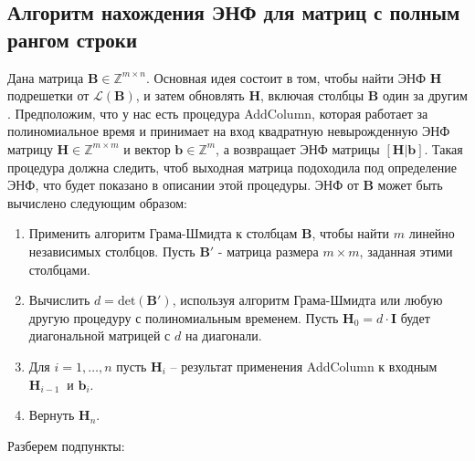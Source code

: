 \subsection{Алгоритм нахождения ЭНФ для матриц с полным рангом строки}

Дана матрица $ \mathbf{B} \in \mathbb{Z}^{m \times n} $. Основная идея состоит в том, чтобы найти ЭНФ $ \mathbf{H} $ подрешетки от $ \mathcal{L}(\mathbf{B}) $, и затем обновлять $ \mathbf{H} $, включая столбцы $ \mathbf{B} $ один за другим \cite{lec4}. Предположим, что у нас есть процедура AddColumn, которая работает за полиномиальное время и принимает на вход квадратную невырожденную ЭНФ матрицу $ \mathbf{H} \in \mathbb{Z}^{m \times m} $ и вектор $ \mathbf{b} \in \mathbb{Z}^{m}$, а возвращает ЭНФ матрицы $ [\mathbf{H|b}] $. Такая процедура должна следить, чтоб выходная матрица подоходила под определение ЭНФ, что будет показано в описании этой процедуры. ЭНФ от $ \mathbf{B} $ может быть вычислено следующим образом:
\begin{enumerate}
\item Применить алгоритм Грама-Шмидта к столбцам $ \mathbf{B} $, чтобы найти $ m $ линейно независимых столбцов. Пусть $ \mathbf{B}' $ - матрица размера $ m \times m $, заданная этими столбцами.
\item Вычислить $ d=\mathrm{det}(\mathbf{B}') $, используя алгоритм Грама-Шмидта или любую другую процедуру с полиномиальным временем. Пусть $ \mathbf{H}_0=d \cdot \mathbf{I} $ будет диагональной матрицей с $ d $ на диагонали.
\item Для $ i=1, \ldots ,n $ пусть $ \mathbf{H}_i $ -- результат применения AddColumn к входным $  \mathbf{H}_{i-1}\ $ и $ \mathbf{b}_i $.
\item Вернуть $ \mathbf{H}_n $.
\end{enumerate}

Разберем подпункты:

